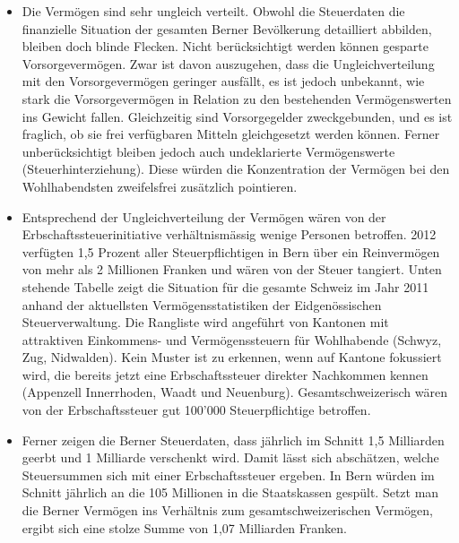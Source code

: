 \documentclass[a4paper, 12pt,liststotoc]{scrartcl}
\numberwithin{equation}{section}
\begin{document}
\begin{itemize}
\item
  Die Vermögen sind sehr ungleich verteilt. Obwohl die Steuerdaten die
  finanzielle Situation der gesamten Berner Bevölkerung detailliert
  abbilden, bleiben doch blinde Flecken. Nicht berücksichtigt werden
  können gesparte Vorsorgevermögen. Zwar ist davon auszugehen, dass die
  Ungleichverteilung mit den Vorsorgevermögen geringer ausfällt, es ist
  jedoch unbekannt, wie stark die Vorsorgevermögen in Relation zu den
  bestehenden Vermögenswerten ins Gewicht fallen. Gleichzeitig sind
  Vorsorgegelder zweckgebunden, und es ist fraglich, ob sie frei
  verfügbaren Mitteln gleichgesetzt werden können. Ferner
  unberücksichtigt bleiben jedoch auch undeklarierte Vermögenswerte
  (Steuerhinterziehung). Diese würden die Konzentration der Vermögen bei
  den Wohlhabendsten zweifelsfrei zusätzlich pointieren.
\item
  Entsprechend der Ungleichverteilung der Vermögen wären von der
  Erbschaftssteuerinitiative verhältnismässig wenige Personen betroffen.
  2012 verfügten 1,5 Prozent aller Steuerpflichtigen in Bern über ein
  Reinvermögen von mehr als 2 Millionen Franken und wären von der Steuer
  tangiert. Unten stehende Tabelle zeigt die Situation für die gesamte
  Schweiz im Jahr 2011 anhand der aktuellsten Vermögensstatistiken der
  Eidgenössischen Steuerverwaltung. Die Rangliste wird angeführt von
  Kantonen mit attraktiven Einkommens- und Vermögenssteuern für
  Wohlhabende (Schwyz, Zug, Nidwalden). Kein Muster ist zu erkennen,
  wenn auf Kantone fokussiert wird, die bereits jetzt eine
  Erbschaftssteuer direkter Nachkommen kennen (Appenzell Innerrhoden,
  Waadt und Neuenburg). Gesamtschweizerisch wären von der
  Erbschaftssteuer gut 100'000 Steuerpflichtige betroffen.
\item
  Ferner zeigen die Berner Steuerdaten, dass jährlich im Schnitt 1,5
  Milliarden geerbt und 1 Milliarde verschenkt wird. Damit lässt sich
  abschätzen, welche Steuersummen sich mit einer Erbschaftssteuer
  ergeben. In Bern würden im Schnitt jährlich an die 105 Millionen in
  die Staatskassen gespült. Setzt man die Berner Vermögen ins Verhältnis
  zum gesamtschweizerischen Vermögen, ergibt sich eine stolze Summe von
  1,07 Milliarden Franken.
\end{itemize}
\end{document}
